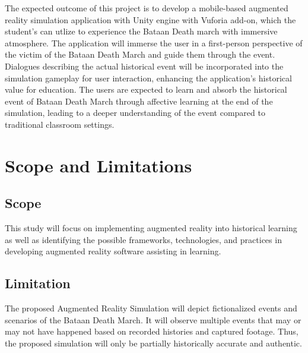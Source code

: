 The expected outcome of this project is to develop a mobile-based augmented reality simulation application with Unity engine with Vuforia add-on, which the student's can utlize to experience the Bataan Death march with immersive atmosphere. The application will immerse the user in a first-person perspective of the victim of the Bataan Death March and guide them through the event. Dialogues describing the actual historical event will be incorporated into the simulation gameplay for user interaction, enhancing the application's historical value for education. The users are expected to learn and absorb the historical event of Bataan Death March through affective learning at the end of the simulation, leading to a deeper understanding of the event compared to traditional classroom settings.
 
\section{Scope and Limitations}
\subsection*{Scope}
This study will focus on implementing augmented reality into historical learning as well as identifying the possible frameworks, technologies, and practices in developing augmented reality software assisting in learning.
\

\subsection*{Limitation}
The proposed Augmented Reality Simulation will depict fictionalized events and scenarios of the Bataan Death March. It will observe multiple events that may or may not have happened based on recorded histories and captured footage. Thus, the proposed simulation will only be partially historically accurate and authentic.

